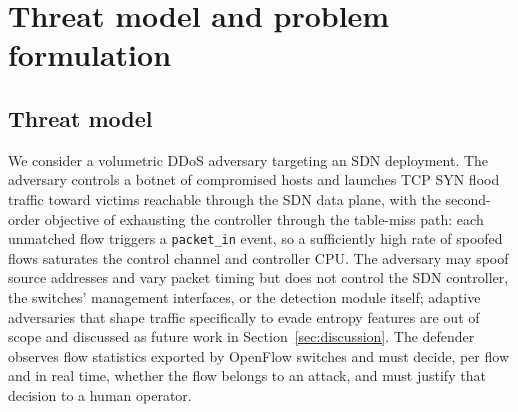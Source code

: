 ﻿\documentclass[journal]{IEEEtran}
\begin{document}
\begin{table}[!t]
\centering
\caption{Qualitative comparison of XAI-SDN with representative prior approaches.}
\label{tab:relwork}
\small
\setlength{\tabcolsep}{4.5pt}
\end{table}

\section{Threat model and problem formulation}
\label{sec:threat}

\subsection{Threat model}
We consider a volumetric DDoS adversary targeting an SDN deployment. The adversary controls a botnet of compromised hosts and launches TCP SYN flood traffic toward victims reachable through the SDN data plane, with the second-order objective of exhausting the controller through the table-miss path: each unmatched flow triggers a \texttt{packet\_in} event, so a sufficiently high rate of spoofed flows saturates the control channel and controller CPU. The adversary may spoof source addresses and vary packet timing but does not control the SDN controller, the switches' management interfaces, or the detection module itself; adaptive adversaries that shape traffic specifically to evade entropy features are out of scope and discussed as future work in Section~\ref{sec:discussion}. The defender observes flow statistics exported by OpenFlow switches and must decide, per flow and in real time, whether the flow belongs to an attack, and must justify that decision to a human operator.
\end{document}
